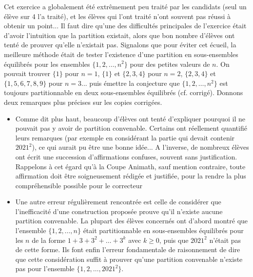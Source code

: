 Cet exercice a globalement été extrêmement peu traité par les candidats (seul un élève sur 4 l'a traité), et les élèves qui l’ont traité n’ont souvent pas réussi à obtenir un point...
Il faut dire qu’une des difficultés principales de l’exercice était d’avoir l’intuition que la partition existait, alors que bon nombre d’élèves ont tenté de prouver qu’elle n’existait pas. Signalons que pour éviter cet écueil, la meilleure méthode était de tester l’existence d’une partition en sous-ensembles équilibrés pour les ensembles $\{1,2,\ldots,n^2\}$ pour des petites valeurs de $n$. On pouvait trouver $\{1\}$ pour $n=1$, $\{1\}$ et $\{2,3,4\}$ pour $n=2$, $\{2,3,4\}$ et $\{1, 5, 6, 7, 8, 9\}$ pour $n=3$... puis émettre la conjecture que $\{1,2,\ldots,n^2\}$ est toujours partitionnable en deux sous-ensembles équilibrés (cf. corrigé).
Donnons deux remarques plus précises sur les copies corrigées.
\begin{itemize}
\item Comme dit plus haut, beaucoup d’élèves ont tenté d’expliquer pourquoi il ne pouvait pas y avoir de partition convenable. Certains ont réellement quantifié leurs remarques (par exemple en considérant la partie qui devait contenir $2021^2$), ce qui aurait pu être une bonne idée... A l’inverse, de nombreux élèves ont écrit une succession d’affirmations confuses, souvent sans justification. Rappelons à cet égard qu’à la Coupe Animath, sauf mention contraire, toute affirmation doit être soigneusement rédigée et justifiée, pour la rendre la plus compréhensible possible pour le correcteur

\item Une autre erreur régulièrement rencontrée est celle de considérer que l’inefficacité d’une construction proposée prouve qu’il n’existe aucune partition convenable. La plupart des élèves concernés ont d'abord montré que l'ensemble $\{1, 2, \ldots, n\}$ était partitionnable en sous-ensembles équilibrés pour les $n$ de la forme $1 + 3 + 3^2 + \ldots + 3^k$ avec $k \geqslant 0$, puis que $2021^2$ n'était pas de cette forme. Ils font enfin l'erreur fondamentale de raisonnement de dire que cette considération suffit à prouver qu'une partition convenable n'existe pas pour l'ensemble $\{1, 2, \ldots, 2021^2\}$.
\end{itemize}
